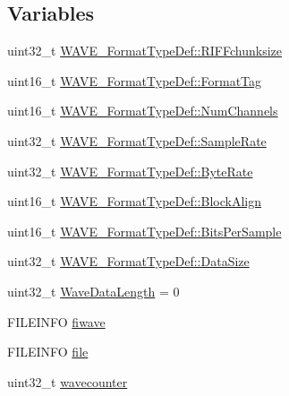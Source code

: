 \subsection*{\-Variables}
\begin{DoxyCompactItemize}
\item 
uint32\-\_\-t \hyperlink{group___w_a_v_e_p_l_a_y_e_r___private___variables_gaeaf1fe0b90f1ff0c7c4bc845e47fe7c5}{\-W\-A\-V\-E\-\_\-\-Format\-Type\-Def\-::\-R\-I\-F\-Fchunksize}
\item 
uint16\-\_\-t \hyperlink{group___w_a_v_e_p_l_a_y_e_r___private___variables_gaa0d6b4c06edc073395827674b4345820}{\-W\-A\-V\-E\-\_\-\-Format\-Type\-Def\-::\-Format\-Tag}
\item 
uint16\-\_\-t \hyperlink{group___w_a_v_e_p_l_a_y_e_r___private___variables_ga2bdeb90779a17e644107a5d855f4d344}{\-W\-A\-V\-E\-\_\-\-Format\-Type\-Def\-::\-Num\-Channels}
\item 
uint32\-\_\-t \hyperlink{group___w_a_v_e_p_l_a_y_e_r___private___variables_ga4f574183b180c6eee94ec82826583941}{\-W\-A\-V\-E\-\_\-\-Format\-Type\-Def\-::\-Sample\-Rate}
\item 
uint32\-\_\-t \hyperlink{group___w_a_v_e_p_l_a_y_e_r___private___variables_ga6f4f0874858518ee7ae3a7beb6bf9f34}{\-W\-A\-V\-E\-\_\-\-Format\-Type\-Def\-::\-Byte\-Rate}
\item 
uint16\-\_\-t \hyperlink{group___w_a_v_e_p_l_a_y_e_r___private___variables_ga50c6bfe090b579d0b94ee9950bb7a03f}{\-W\-A\-V\-E\-\_\-\-Format\-Type\-Def\-::\-Block\-Align}
\item 
uint16\-\_\-t \hyperlink{group___w_a_v_e_p_l_a_y_e_r___private___variables_gaed7cbe094ecca9b29332a1209f88a535}{\-W\-A\-V\-E\-\_\-\-Format\-Type\-Def\-::\-Bits\-Per\-Sample}
\item 
uint32\-\_\-t \hyperlink{group___w_a_v_e_p_l_a_y_e_r___private___variables_ga25442a9c895536fb4a7837811a8fe810}{\-W\-A\-V\-E\-\_\-\-Format\-Type\-Def\-::\-Data\-Size}
\item 
uint32\-\_\-t \hyperlink{group___w_a_v_e_p_l_a_y_e_r___private___variables_gaed5f7e51bea110d2f608278ffe6c48a3}{\-Wave\-Data\-Length} = 0
\item 
\-F\-I\-L\-E\-I\-N\-F\-O \hyperlink{group___w_a_v_e_p_l_a_y_e_r___private___variables_gac9bc5ab0452e6a4f10de109bc847d6d5}{fiwave}
\item 
\-F\-I\-L\-E\-I\-N\-F\-O \hyperlink{group___w_a_v_e_p_l_a_y_e_r___private___variables_ga48b699d30a027a1d6326588c99d716e1}{file}
\item 
uint32\-\_\-t \hyperlink{group___w_a_v_e_p_l_a_y_e_r___private___variables_ga39e802dfcf3592a17543c656dba18064}{wavecounter}

\end{DoxyCompactItemize}
